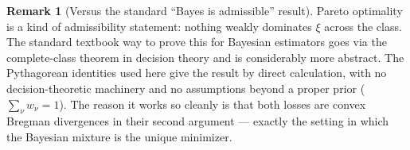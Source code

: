 \documentclass[fontsize=11pt, parskip=half]{scrartcl}
\theoremstyle{definition}
\newtheorem{remark}[theorem]{Remark}
\begin{document}
\begin{remark}[Versus the standard ``Bayes is admissible'' result]
Pareto optimality is a kind of admissibility statement: nothing weakly
dominates $\xi$ across the class. The standard textbook way to prove this for
Bayesian estimators goes via the complete-class theorem in decision theory and
is considerably more abstract. The Pythagorean identities used here give the
result by direct calculation, with no decision-theoretic machinery and no
assumptions beyond a proper prior ($\sum_\nu w_\nu = 1$). The reason it works
so cleanly is that both losses are convex Bregman divergences in their second
argument --- exactly the setting in which the Bayesian mixture is the unique
minimizer.
\end{remark}
\end{document}
